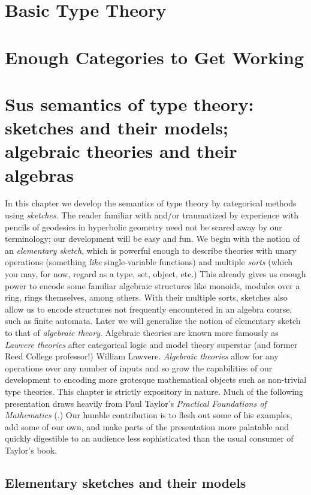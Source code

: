 \documentclass[12pt,twoside]{reedthesis}
\begin{document}
\chapter{Basic Type Theory}
\chapter{Enough Categories to Get Working}
\chapter{Sus semantics of type theory: sketches and their models; algebraic theories and their algebras}
In this chapter we develop the semantics of type theory by categorical methods
using \emph{sketches}. The reader familiar with and/or traumatized by experience
with pencils of geodesics in hyperbolic geometry need not be scared away by our
terminology; our development will be easy and fun. We begin with the notion of
an \emph{elementary sketch}, which is powerful enough to describe theories with
unary operations (something \emph{like} single-variable functions) and multiple
\emph{sorts} (which you may, for now, regard as a type, set, object, etc.) This
already gives us enough power to encode some familiar algebraic structures like
monoids, modules over a ring, rings themselves, among others. With their
multiple sorts, sketches also allow us to encode structures not frequently
encountered in an algebra course, such as finite automata. Later we will
generalize the notion of elementary sketch to that of \emph{algebraic theory}.
Algebraic theories are known more famously as \emph{Lawvere theories} after
categorical logic and model theory superstar (and former Reed College
professor!) William Lawvere. \emph{Algebraic theories} allow for any operations
over any number of inputs and so grow the capabilities of our development to
encoding more grotesque mathematical objects such as non-trivial type theories.
This chapter is strictly expository in nature. Much of the following
presentation draws heavily from Paul Taylor's \emph{Practical Foundations of
  Mathematics} (\cite{taylor_practical_1999}.) Our humble contribution is to
flesh out some of his examples, add some of our own, and make parts of the
presentation more palatable and quickly digestible to an audience less
sophisticated than the usual consumer of Taylor's book.

\section{Elementary sketches and their models}
\end{document}
